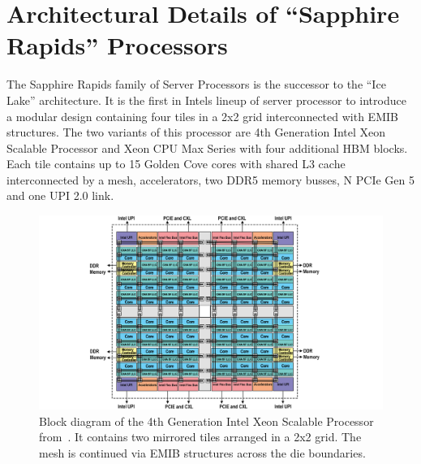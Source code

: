 \chapter{Architectural Details of ``Sapphire Rapids'' Processors}
The Sapphire Rapids family of Server Processors is the successor to the ``Ice Lake'' architecture.
It is the first in Intels lineup of server processor to introduce a modular design containing four tiles in a 2x2 grid interconnected with EMIB structures.
The two variants of this processor are 4th Generation Intel Xeon Scalable Processor and Xeon CPU Max Series with four additional HBM blocks.~\cite{Intel_2021_Hotchips}
Each tile contains up to 15 Golden Cove cores with shared L3 cache interconnected by a mesh, accelerators, two DDR5 memory busses, N PCIe Gen 5 and one UPI 2.0 link.

\begin{figure}[]
    \centering
    \includegraphics[width=\columnwidth]{fig/spr-uma.png}
    \caption{Block diagram of the 4th Generation Intel Xeon Scalable Processor from~\cite{Intel_4th_gen_scalable}.
It contains two mirrored tiles arranged in a 2x2 grid. The mesh is continued via EMIB structures across the die boundaries.~\cite{Intel_2022_ISSCC}}
\end{figure}